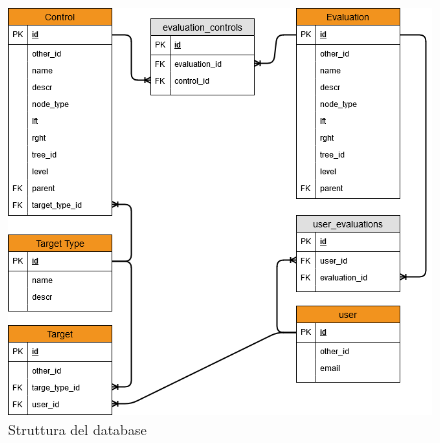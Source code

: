 \begin{figure}[ht!]
	\centering
	\includegraphics[scale=0.7]{images/MoonCloudRecommendation_ER.png}
	\caption{Struttura del database}
	\label{fig:str_db_project}
\end{figure}










